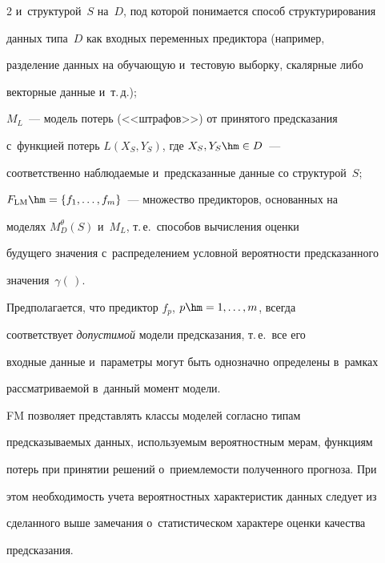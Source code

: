 \begin{multicols}{2}
и~структурой~$S$ на~$D$, под которой понимается способ структурирования 


данных типа~$D$ как входных переменных предиктора (например, 


разделение данных на обуча\-ющую и~тес\-то\-вую выборку, скалярные либо 


векторные данные и~т.\,д.); 


   $M_L$~--- модель потерь (<<штрафов>>) от принятого предсказания 


с~функцией потерь $L(X_S,Y_S)$, где $X_S, Y_S \hm\in D$~--- 


соответственно наблюдаемые и~предсказанные данные со структурой~$S$; 


  $F_{\mathrm{LM}}\hm =\{f_1, \ldots , f_m\}$~--- множество предикторов, основанных на 


моделях $M_D^\theta(S)$ и~$M_L$,  т.\,е.\ способов вычисления оценки 


будущего значения с~распределением условной вероятности предсказанного 


значения~$\gamma(\,)$. 


  


  Предполагается, что предиктор $f_p$, $p\hm=1, \ldots, m$, всегда 


соответствует \textit{допустимой} модели предсказания, т.\,е.\ все его 


входные данные и~параметры могут быть однозначно определены в~рамках 


рассматриваемой в~данный момент модели. 


  


  FM позволяет представлять классы моделей согласно типам 


предсказываемых данных, используемым вероятностным мерам, функциям 


потерь при принятии решений о~приемлемости полученного прогноза. При 


этом необходимость учета вероятностных характеристик данных следует из 


сделанного выше замечания о~статистическом характере оценки качества 


предсказания.





\smallskip


  


  \noindent



\end{multicols}
